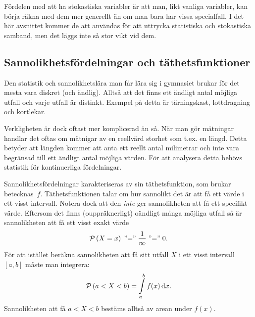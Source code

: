 \documentclass[11pt,a4paper, swedish
]{article}
\newcommand{\PP}[1]{\ensuremath\mathcal{P}\left(#1\right)}
\begin{document}
Fördelen med att ha stokastiska variabler är att man, likt vanliga
variabler, kan börja räkna med dem mer generellt än om man bara har
vissa specialfall. I det här avsnittet kommer de att användas för att
uttrycka statistiska och stokastiska samband, men det läggs inte så
stor vikt vid dem. 

\subsection{Sannolikhetsfördelningar och täthetsfunktioner}
Den statistik och sannolikhetslära man får lära sig i gymnasiet brukar
för det mesta vara diskret (och ändlig). Alltså att det finns ett
ändligt antal möjliga utfall och varje utfall är distinkt. Exempel på
detta är tärningskast, lottdragning och kortlekar. 

Verkligheten är dock oftast mer komplicerad än så. När man gör
mätningar handlar det oftas om mätnigar av en reellvärd storhet som
t.ex. en längd\footnotemark{}. Detta betyder att längden kommer att
anta ett reellt antal milimetrar och inte vara begränsad till ett
ändligt antal möjliga värden. För att analysera detta behövs statistik
för kontinuerliga fördelningar.  

Sannolikhetsfördelningar karakteriseras av sin täthetsfunktion, som
brukar betecknas~$f$. Täthetsfunktionen talar om hur sannolikt det är
att få ett värde i ett visst intervall. Notera dock att den
\emph{inte} ger sannolikheten att få ett specifikt värde. 
Eftersom det finns (ouppräknerligt) oändligt många möjliga utfall så
är sannolikheten att få ett visst exakt värde
\begin{equation}
\PP{X=x}\; \text{''=''}\; \frac{1}{\infty}\; \text{''=''}\;0.
\end{equation}
För att istället beräkna sannolikheten att få sitt utfall $X$ i ett
visst intervall $[a, b]$ måste man integrera:
\begin{equation}\label{eq:dist_P}
\PP{a<X<b} = \int_a^b f(x) \id{x}.
\end{equation}
Sannolikheten att få $a<X<b$ bestäms alltså av arean under $f(x)$.
\end{document}
